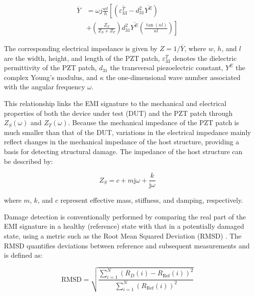 \documentclass[journal,twoside,web]{ieeecolor}
\begin{document}
\begin{equation}
\begin{split}
    \overline{Y} &= \omega j \frac{wl}{h} \left[ \left( \overline{\varepsilon^T_{33}} - d^2_{31} \overline{Y^E} \right) \right. \\
    &\left. + \left( \frac{Z_T}{Z_S + Z_T} \right) d_{31}^2 \overline{Y^E} \left( \frac{\tan(\kappa l)}{\kappa l} \right) \right]
\end{split}
\label{eq:EMIA}
\end{equation}

The corresponding electrical impedance is given by $Z = 1 / \bar{Y}$, where $w$, $h$, and $l$ are the width, height, and length of the PZT patch, $\varepsilon_{33}^T$ denotes the dielectric permittivity of the PZT patch, $d_{31}$ the transversal piezoelectric constant, $Y^E$ the complex Young's modulus, and $\kappa$ the one-dimensional wave number associated with the angular frequency $\omega$.

This relationship links the EMI signature to the mechanical and electrical properties of both the device under test (DUT) and the PZT patch through $Z_S(\omega)$ and $Z_T(\omega)$. Because the mechanical impedance of the PZT patch is much smaller than that of the DUT, variations in the electrical impedance mainly reflect changes in the mechanical impedance of the host structure, providing a basis for detecting structural damage. The impedance of the host structure can be described by:

\begin{equation}
Z_S = c + m\mathrm{j}\omega + \frac{k}{\mathrm{j}\omega}
\label{eq:blockImpedance}
\end{equation}

where $m$, $k$, and $c$ represent effective mass, stiffness, and damping, respectively.

Damage detection is conventionally performed by comparing the real part of the EMI signature in a healthy (reference) state with that in a potentially damaged state, using a metric such as the Root Mean Squared Deviation (RMSD) \cite{na2018review}. The RMSD quantifies deviations between reference and subsequent measurements and is defined as:

\begin{equation}
\mathrm{RMSD}=\sqrt{\frac{\sum_{i=1}^{N} \left( R_D(i) - R_{\mathrm{Ref}}(i) \right)^2
}{\sum_{i=1}^{N} \left( R_{\mathrm{Ref}}(i) \right)^2}}
\label{eq:rmsd}
\end{equation}
\end{document}
